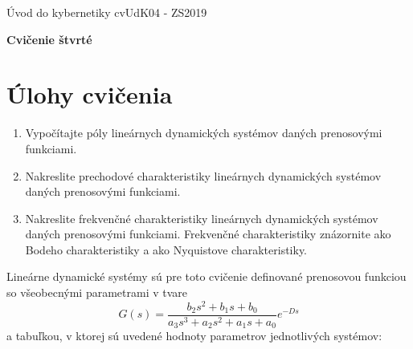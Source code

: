 \documentclass[a4paper, 10pt, ]{article}
\def\oznacenieCasti{cvUdK04 - ZS2019}
\begin{document}
\fontsize{12pt}{22pt}\selectfont

\centerline{\textsf{Úvod do kybernetiky} \hfill \textsf{\oznacenieCasti}}

\fontsize{18pt}{22pt}\selectfont





\begin{flushleft}
    \textbf{\textsf{Cvičenie štvrté}}
\end{flushleft}





\normalsize

\bigskip


\bigskip

\vspace{18pt}



\section{Úlohy cvičenia}

\begin{enumerate}

	\item Vypočítajte póly lineárnych dynamických systémov daných prenosovými funkciami.

	\item Nakreslite prechodové charakteristiky lineárnych dynamických systémov daných prenosovými funkciami.

	\item Nakreslite frekvenčné charakteristiky lineárnych dynamických systémov daných prenosovými funkciami. Frekvenčné charakteristiky znázornite ako Bodeho charakteristiky a ako Nyquistove charakteristiky.

\end{enumerate}



\noindent
Lineárne dynamické systémy sú pre toto cvičenie definované prenosovou funkciou so všeobecnými parametrami v tvare
\begin{equation}
	G(s) = \frac{b_2 s^2 + b_1 s + b_0}{a_3 s^3 + a_2 s^2 + a_1 s + a_0} e^{-Ds}
\end{equation}
a tabuľkou, v ktorej sú uvedené hodnoty parametrov jednotlivých systémov:



\bigskip
\end{document}
